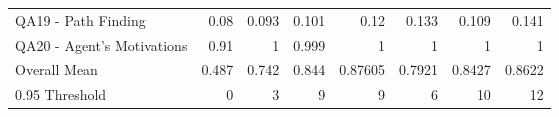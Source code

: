 \begin{tabular}{lrrrrrrr}
 QA19 - Path Finding          &           0.08  &                        0.093 &                           0.101 &                         0.12    &                       0.133  &                       0.109  &                       0.141  \\
 QA20 - Agent's Motivations   &           0.91  &                        1     &                           0.999 &                         1       &                       1      &                       1      &                       1      \\
 Overall Mean                 &           0.487 &                        0.742 &                           0.844 &                         0.87605 &                       0.7921 &                       0.8427 &                       0.8622 \\
 0.95 Threshold               &           0     &                        3     &                           9     &                         9       &                       6      &                      10      &                      12      \\
\bottomrule
\end{tabular}

